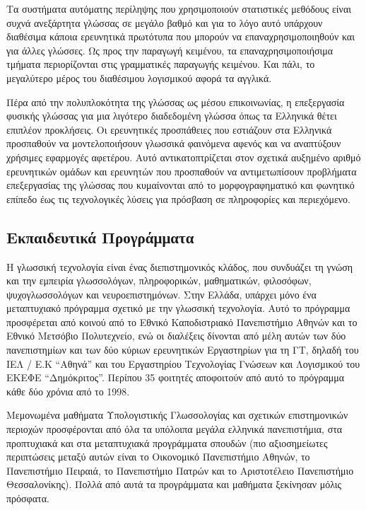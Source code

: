 \documentclass[]{../../metanetpaper}
\begin{document}
\begin{multicols}{2}
Τα συστήματα αυτόματης περίληψης που χρησιμοποιούν στατιστικές μεθόδους είναι συχνά ανεξάρτητα γλώσσας σε μεγάλο βαθμό και για το λόγο αυτό υπάρχουν διαθέσιμα κάποια ερευνητικά πρωτότυπα που μπορούν να επαναχρησιμοποιηθούν και για άλλες γλώσσες. Ως προς την παραγωγή κειμένου, τα επαναχρησιμοποιήσιμα τμήματα περιορίζονται στις γραμματικές παραγωγής κειμένου. Και πάλι, το μεγαλύτερο μέρος του διαθέσιμου λογισμικού αφορά τα αγγλικά.

Πέρα από την πολυπλοκότητα της γλώσσας ως μέσου επικοινωνίας, η επεξεργασία φυσικής γλώσσας για μια λιγότερο διαδεδομένη γλώσσα όπως τα Ελληνικά θέτει επιπλέον προκλήσεις. Οι ερευνητικές προσπάθειες που εστιάζουν στα Ελληνικά προσπαθούν να μοντελοποιήσουν γλωσσικά φαινόμενα αφενός και να αναπτύξουν χρήσιμες εφαρμογές αφετέρου. Αυτό αντικατοπτρίζεται στον σχετικά αυξημένο αριθμό ερευνητικών ομάδων και ερευνητών που προσπαθούν να αντιμετωπίσουν προβλήματα επεξεργασίας της γλώσσας που κυμαίνονται από το μορφογραφηματικό και φωνητικό επίπεδο έως τις τεχνολογικές λύσεις για πρόσβαση σε πληροφορίες και περιεχόμενο.

\subsection{Εκπαιδευτικά Προγράμματα}

Η γλωσσική τεχνολογία είναι ένας διεπιστημονικός κλάδος, που συνδυάζει τη γνώση και την εμπειρία γλωσσολόγων, πληροφορικών, μαθηματικών, φιλοσόφων, ψυχογλωσσολόγων και νευροεπιστημόνων. Στην Ελλάδα, υπάρχει μόνο ένα μεταπτυχιακό πρόγραμμα σχετικό με την γλωσσική τεχνολογία. Αυτό το πρόγραμμα προσφέρεται από κοινού από το Εθνικό Καποδιστριακό Πανεπιστήμιο Αθηνών και το Εθνικό Μετσόβιο Πολυτεχνείο, ενώ οι διαλέξεις δίνονται από μέλη αυτών των δύο πανεπιστημίων και των δύο κύριων ερευνητικών Εργαστηρίων για τη ΓΤ, δηλαδή του ΙΕΛ / Ε.Κ “Αθηνά” και του Εργαστηρίου Τεχνολογίας Γνώσεων και Λογισμικού του ΕΚΕΦΕ “Δημόκριτος”. Περίπου 35 φοιτητές αποφοιτούν από αυτό το πρόγραμμα κάθε δύο χρόνια από το 1998.

Μεμονωμένα μαθήματα Υπολογιστικής Γλωσσολογίας και σχετικών επιστημονικών περιοχών προσφέρονται από όλα τα υπόλοιπα μεγάλα ελληνικά πανεπιστήμια, στα προπτυχιακά και στα μεταπτυχιακά προγράμματα σπουδών (πιο αξιοσημείωτες περιπτώσεις μεταξύ αυτών είναι το Οικονομικό Πανεπιστήμιο Αθηνών, το Πανεπιστήμιο Πειραιά, το Πανεπιστήμιο Πατρών και το Αριστοτέλειο Πανεπιστήμιο Θεσσαλονίκης). Πολλά από αυτά τα προγράμματα και μαθήματα ξεκίνησαν μόλις πρόσφατα.


\end{multicols}
\end{document}
